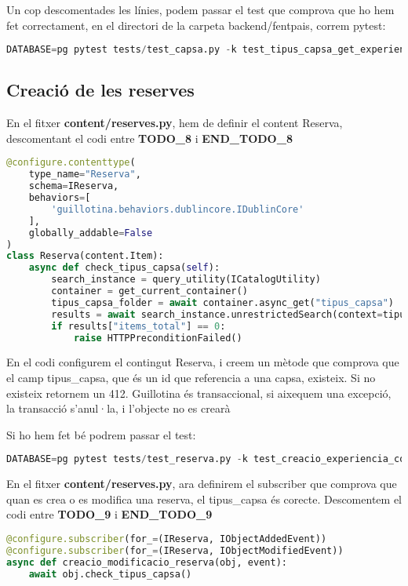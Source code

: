 \documentclass[a4paper, 11pt]{article}
\begin{document}
      
Un cop descomentades les línies, podem passar el test que comprova
  que ho hem fet correctament, en el directori de la carpeta
  backend/fentpais, correm pytest:
\begin{lstlisting}[language=Python, caption=Testing 4]
  DATABASE=pg pytest tests/test_capsa.py -k test_tipus_capsa_get_experiencies_endpoint
\end{lstlisting}

\subsection{Creació de les reserves}
En el fitxer \textbf{content/reserves.py}, hem de definir el content Reserva, descomentant el codi entre
\textbf{TODO\_8} i \textbf{END\_TODO\_8}

\begin{lstlisting}[language=Python, caption=Definició content type Reserva]
@configure.contenttype(
    type_name="Reserva",
    schema=IReserva,
    behaviors=[
        'guillotina.behaviors.dublincore.IDublinCore'
    ],
    globally_addable=False
)
class Reserva(content.Item):
    async def check_tipus_capsa(self):
        search_instance = query_utility(ICatalogUtility)
        container = get_current_container()
        tipus_capsa_folder = await container.async_get("tipus_capsa")
        results = await search_instance.unrestrictedSearch(context=tipus_capsa_folder, query={"id": self.tipus_capsa})
        if results["items_total"] == 0:
            raise HTTPPreconditionFailed()
\end{lstlisting}
En el codi configurem el contingut Reserva, i creem un mètode que
comprova que el camp tipus\_capsa, que és un id que referencia a una
capsa, existeix. Si no existeix retornem un 412. Guillotina és
transaccional, si aixequem una excepció, la transacció s'anul·la, i
l'objecte no es crearà

Si ho hem fet bé podrem passar el test:
\begin{lstlisting}[language=Python, caption=Testing 5]
  DATABASE=pg pytest tests/test_reserva.py -k test_creacio_experiencia_correcte
\end{lstlisting}

En el fitxer \textbf{content/reserves.py}, ara definirem el subscriber
que comprova que quan es crea o es modifica una reserva, el
tipus\_capsa és corecte. Descomentem el codi entre \textbf{TODO\_9} i
\textbf{END\_TODO\_9}

\begin{lstlisting}[language=Python, caption=Definició subscriber Reserva]
@configure.subscriber(for_=(IReserva, IObjectAddedEvent))
@configure.subscriber(for_=(IReserva, IObjectModifiedEvent))
async def creacio_modificacio_reserva(obj, event):
    await obj.check_tipus_capsa()
  \end{lstlisting}
\end{document}
